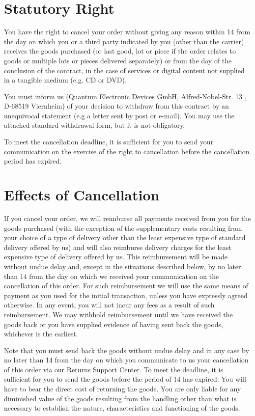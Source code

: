 \documentclass[%
    a4paper,%
    10pt,
]{scrartcl}
\begin{document}
\section*{Statutory Right}
You have the right to cancel your order without giving any reason within \qty{14}{\days} from the day on which you or a third party indicated by you (other than the carrier) receives the goods purchased (or last good, lot or piece if the order relates to goods or multiple lots or pieces delivered separately) or from the day of the conclusion of the contract, in the case of services or digital content not supplied in a tangible medium (e.g. CD or DVD).

You must inform us (Quantum Electronic Devices GmbH, Alfred-Nobel-Str. 13 , D-68519 Viernheim) of your decision to withdraw from this contract by an unequivocal
statement (e.g a letter sent by post or e-mail). You may use the attached standard
withdrawal form, but it is not obligatory.

To meet the cancellation deadline, it is sufficient for you to send your communication on the exercise of the right to cancellation before the cancellation period has expired.

\section*{Effects of Cancellation }
If you cancel your order, we will reimburse all payments received from you for the goods purchased (with the exception of the supplementary costs resulting
from your choice of a type of delivery other than the least expensive type of standard delivery offered by us) and will also reimburse delivery charges for the least expensive type of delivery offered by us. This reimbursement will be made without undue delay and, except in the situations described below, by no later than \qty{14}{\days} from the day on which we received your communication on the cancellation of this order. For such reimbursement we will use the same means of payment as you used for the initial transaction, unless you have expressly agreed otherwise. In any event, you will not incur any fees as a result of such reimbursement. We may withhold reimbursement until we have received the goods back or you have supplied evidence of having sent back the goods, whichever is the earliest.

Note that you must send back the goods without undue delay and in any case by no later than \qty{14}{\days} from the day on which you communicate to us your cancellation of this order via our Returns Support Center. To meet the deadline, it is sufficient for you to send the goods before the period of \qty{14}{\days} has expired. You will have to bear the direct cost of returning the goods. You are only liable for any diminished value of the goods resulting from the handling other than what is necessary to establish the nature, characteristics and functioning of the goods.
\end{document}
